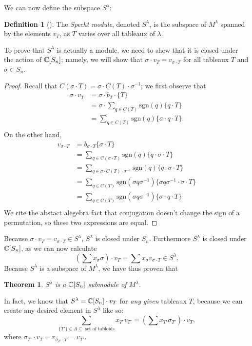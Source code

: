 \documentclass[12pt,twoside]{reedthesis}
\theoremstyle{plain}   %
\newtheorem{thm}{Theorem}[section] %
\theoremstyle{definition}
\newtheorem{defn}{Definition}[section]
\theoremstyle{remark}
\numberwithin{equation}{section}
\def\sgn{\mathrm{sgn}}
\begin{document}
  We can now define the subspace $S^\lambda$:
  \begin{defn}[{\cite[Pg. 87]{fulton}}]
    The \emph{Specht module}, denoted \emph{$S^\lambda$}, is the subspace of $M^\lambda$ spanned by the elements $v_T$, as $T$ varies over all tableaux of
    $\lambda$.
  \end{defn}
  To prove that $S^\lambda$ is actually a module, we need to show that it is closed under the action of $\mathbb{C}[S_n]$; namely,
  we will show that $\sigma \cdot v_T = v_{\sigma \cdot T}$ for all tableaux $T$ and $\sigma \in S_n$.
  \begin{proof}
    Recall that $C(\sigma \cdot T) = \sigma \cdot C(T) \cdot \sigma^{-1}$; we first observe that
    \begin{align*}
      \sigma \cdot v_{T} &= \sigma \cdot b_T \cdot \{ T\} \\
                         &= \sigma \cdot \sum_{ q \in C(T)} \sgn(q) \{q \cdot T\} \\
                         &= \sum_{ q \in C(T)} \sgn(q) \{\sigma \cdot q \cdot T\}. \\
    \end{align*}
    On the other hand,
    \begin{align*}
      v_{\sigma \cdot T} &= b_{\sigma \cdot T} \{ \sigma \cdot T\} \\
                         &= \sum_{q \in C(\sigma \cdot T)} \sgn(q) \{q \cdot \sigma \cdot T\}\\
                         &= \sum_{q \in \sigma \cdot C(T) \cdot \sigma^{-1}} \sgn(q) \{q \cdot \sigma \cdot T\}\\
                         &= \sum_{q \in C(T)} \sgn(\sigma q \sigma^{-1}) \{\sigma q \sigma^{-1} \cdot \sigma \cdot T\}\\
                         &= \sum_{q \in C(T)} \sgn(\sigma q \sigma^{-1}) \{\sigma \cdot q \cdot T\}\\      
    \end{align*}
    We cite the abstact alegebra fact that conjugation doesn't change the sign of a permutation, so these two expressions are equal.
  \end{proof}

  Because $\sigma \cdot v_T = v_{\sigma \cdot T} \in S^\lambda$, $S^\lambda$ is closed under $S_n$. Furthermore $S^\lambda$ is closed under $\mathbb{C} [S_n]$, as we can
  now calculate
  \[(\sum x_\sigma \sigma) \cdot v_T = \sum x_\sigma v_{\sigma \cdot T} \in S^\lambda.\]
  Because $S^\lambda$ is a subspace of $M^\lambda$, we have thus proven that
  \begin{thm}
    $S^\lambda$ is a $\mathbb{C}[S_n]$ submodule of $M^\lambda$.
  \end{thm}
  In fact, we know that $S^\lambda = \mathbb{C}[S_n] \cdot v_T$ for \emph{any given} tableaux $T$,
  because we can create any desired element in $S^\lambda$ like so:
  \[\sum_{\{T'\} \in A \subseteq \text{ set of tabloids}} x_{T'} v_{T'} = (\sum x_{T'} \sigma_{T'}) \cdot v_T,\]
  where $\sigma_{T'} \cdot v_T = v_{\sigma_{T'} \cdot T} = v_{T'}$.
\end{document}

